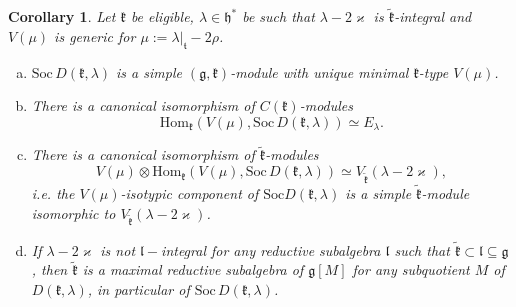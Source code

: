 \documentclass[default]{./styles/svmult}
\newtheorem{cor}[theo]{Corollary}
\newcommand{\Soc}{\mathrm{Soc}}
\newcommand{\Hom}{\mathrm{Hom}}
\renewcommand{\gg}{\mathfrak{g}}
\newcommand{\hh}{\mathfrak{h}}
\newcommand{\kk}{\mathfrak{k}}
\renewcommand{\ll}{\mathfrak{l}}
\renewcommand{\tt}{\mathfrak{t}}
\begin{document}
\begin{cor}\label{corr:8}
    Let $\kk$ be eligible, $\lambda\in\hh^*$ be such that $\lambda-2\varkappa$ is $\tilde{\kk}$-integral and $V(\mu)$ is generic for $\mu:= \lambda|_{\tt}-2\rho$.
	\begin{enumerate}[a)]
	    \item $\Soc\,D(\kk,\lambda)$ is a simple $(\gg,\kk)$-module with unique minimal $\kk$-type $V(\mu)$.
		\item There is a canonical isomorphism of $C(\kk)$-modules
		$$\Hom_\kk(V(\mu),\Soc\,D(\kk,\lambda))\simeq E_\lambda.$$
		\item There is a canonical isomorphism of $\tilde{\kk}$-modules
		$$V(\mu)\otimes\Hom_\kk(V(\mu),\Soc\,D(\kk,\lambda))\simeq V_{\tilde{\kk}}(\lambda-2\varkappa),$$
		i.e. the $V(\mu)$-isotypic component of $\Soc D(\kk,\lambda)$ is a simple $\tilde{\kk}$-module isomorphic to $V_{\tilde{\kk}}(\lambda-2\varkappa)$.
		\item If $\lambda-2\varkappa$ is not $\ll-$integral for any reductive subalgebra $\ll$ such that $\tilde{\kk} \subset \ll \subseteq \gg$, then $\tilde{\kk}$ is a maximal reductive subalgebra of $\gg[M]$ for any subquotient $M$ of $D(\kk,\lambda)$, in particular of $\Soc\,D(\kk,\lambda)$.
	\end{enumerate}
\end{cor}
\end{document}
